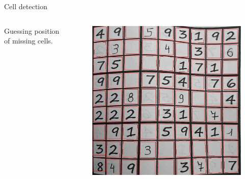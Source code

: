 \documentclass[12pt, dvipsnames]{beamer}
\begin{document}
\begin{frame}{Cell detection}
    \begin{columns}
        \alert{Guessing} position of missing cells.
        \begin{figure}
            \centering
            \includegraphics[width=1\textwidth]{resources/sudoku/sudoku_0025_06.jpg}
        \end{figure}
    \end{columns}
\end{frame}
\end{document}
